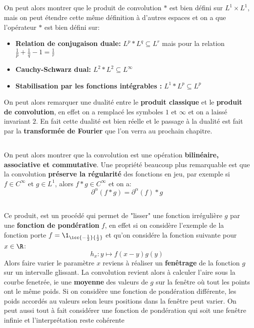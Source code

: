 \subsection*{}
On peut alors montrer que le produit de convolution \( * \) est bien défini sur \( L^1 \times L^1 \), mais on peut étendre cette même définition à d'autres espaces et on a que l'opérateur \( * \) est bien défini sur:
\begin{itemize}
   \item \textbf{Relation de conjugaison duale: } \( L^p*L^q \subseteq L^r \) mais pour la relation \( \frac{1}{p} + \frac{1}{q} - 1 = \frac{1}{r} \)
   \item \textbf{Cauchy-Schwarz dual: }\( L^2*L^2 \subseteq L^\infty \)
   \item \textbf{Stabilisation par les fonctions intégrables : }\( L^1*L^p \subseteq L^p  \)
\end{itemize}
On peut alors remarquer une dualité entre le \textbf{produit classique} et le \textbf{produit de convolution}, en effet on a remplacé les symboles \( 1 \) et \( \infty \) et on a laissé invariant \( 2 \). En fait cette dualité est bien réelle et le passage à la dualité est fait par la \textbf{transformée de Fourier} que l'on verra au prochain chapitre.

\subsection*{}
On peut alors montrer que la convolution est une opération \textbf{bilinéaire, associative et commutative}. Une propriété beaucoup plus remarquable est que la convolution \textbf{préserve la régularité} des fonctions en jeu, par exemple si \( f \in C^\infty\) et \( g \in L^1\), alors \( f * g \in C^\infty \) et on a:
\[ 
   \partial^\alpha(f * g) = \partial^\alpha(f) * g
\]
\subsection*{}
Ce produit, est un procédé qui permet de "lisser" une fonction irrégulière \( g \) par une \textbf{fonction de pondération} \( f \), en effet si on considère l'exemple de la fonction porte \(f = \1_{\icc{-\frac{1}{2}}{\frac{1}{2}}}\) et qu'on considére la fonction suivante pour \( x \in \R \):
\[ 
   h_x : y \longmapsto f(x - y)g(y)
\]
Alors faire varier le paramètre \( x \) reviens à réaliser un \textbf{fenêtrage} de la fonction \( g \) sur un intervalle glissant. La convolution revient alors à calculer l'aire sous la courbe fenetrée, ie une \textbf{moyenne} des valeurs de \( g \) sur la fenêtre où tout les points ont le même poids. Si on considère une fonction de pondération différente, les poids accordés au valeurs selon leurs positions dans la fenêtre peut varier. On peut aussi tout à fait considérer une fonction de pondération qui soit une fenêtre infinie et l'interprétation reste cohérente
\pagebreak

